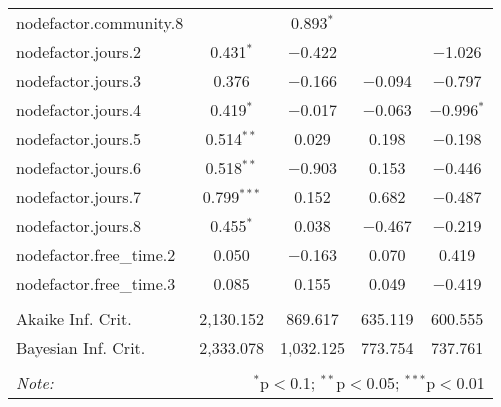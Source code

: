 \documentclass[11pt]{article}
\begin{document}
\begin{table}[!htbp]
\begin{tabular}{@{\extracolsep{5pt}}lcccc}
  nodefactor.community.8 &  & 0.893$^{*}$ &  &  \\ 
  nodefactor.jours.2 & 0.431$^{*}$ & $-$0.422 &  & $-$1.026 \\ 
  nodefactor.jours.3 & 0.376 & $-$0.166 & $-$0.094 & $-$0.797 \\ 
  nodefactor.jours.4 & 0.419$^{*}$ & $-$0.017 & $-$0.063 & $-$0.996$^{*}$ \\ 
  nodefactor.jours.5 & 0.514$^{**}$ & 0.029 & 0.198 & $-$0.198 \\ 
  nodefactor.jours.6 & 0.518$^{**}$ & $-$0.903 & 0.153 & $-$0.446 \\ 
  nodefactor.jours.7 & 0.799$^{***}$ & 0.152 & 0.682 & $-$0.487 \\ 
  nodefactor.jours.8 & 0.455$^{*}$ & 0.038 & $-$0.467 & $-$0.219 \\ 
  nodefactor.free\_time.2 & 0.050 & $-$0.163 & 0.070 & 0.419 \\ 
  nodefactor.free\_time.3 & 0.085 & 0.155 & 0.049 & $-$0.419 \\ 
 \hline \\[-1.8ex] 
Akaike Inf. Crit. & 2,130.152 & 869.617 & 635.119 & 600.555 \\ 
Bayesian Inf. Crit. & 2,333.078 & 1,032.125 & 773.754 & 737.761 \\ 
\hline 
\hline \\[-1.8ex] 
\textit{Note:}  & \multicolumn{4}{r}{$^{*}$p$<$0.1; $^{**}$p$<$0.05; $^{***}$p$<$0.01} \\ 
\end{tabular} 
\end{table} 
\end{document}
